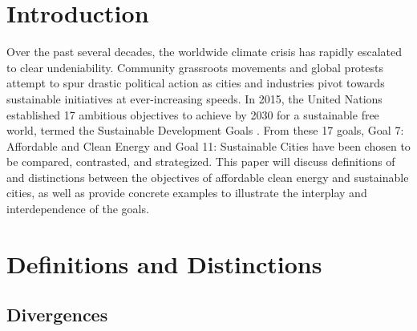 \documentclass[10pt, oneside, letterpaper]{article}
\begin{document}
	\begin{multicols}{2}

	\section{Introduction}

	Over the past several decades, the worldwide climate crisis has rapidly escalated to clear undeniability. Community grassroots movements and global protests attempt to spur drastic political action as cities and industries pivot towards sustainable initiatives at ever-increasing speeds. In 2015, the United Nations established 17 ambitious objectives to achieve by 2030 for a sustainable free world, termed the Sustainable Development Goals \cite{UN2015}. From these 17 goals, Goal 7: Affordable and Clean Energy and Goal 11: Sustainable Cities have been chosen to be compared, contrasted, and strategized. This paper will discuss definitions of and distinctions between the objectives of affordable clean energy and sustainable cities, as well as provide concrete examples to illustrate the interplay and interdependence of the goals.

	\section{Definitions and Distinctions}
	
	\subsection{Divergences}


\end{multicols}
\end{document}
